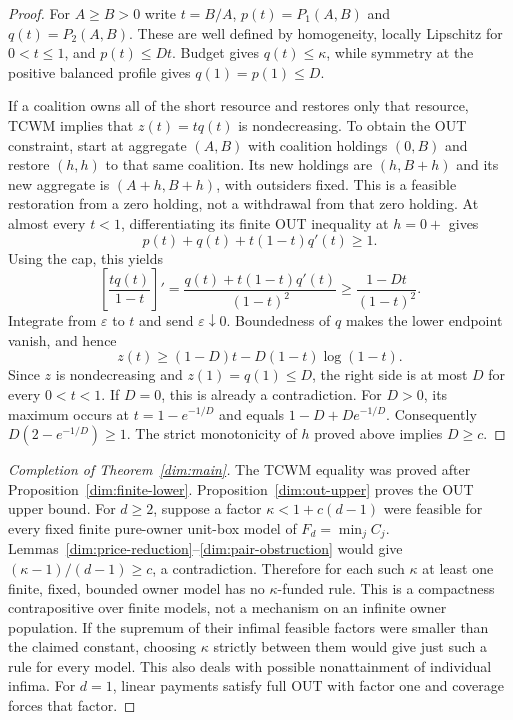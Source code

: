 \documentclass[11pt]{article}
\theoremstyle{definition}\newtheorem{definition}[theorem]{Definition}
\theoremstyle{remark}\newtheorem{remark}[theorem]{Remark}
\begin{document}
\begin{proof}
For $A\ge B>0$ write $t=B/A$, $p(t)=P_1(A,B)$ and $q(t)=P_2(A,B)$.
These are well defined by homogeneity, locally Lipschitz for $0<t\le1$,
and $p(t)\le Dt$. Budget gives $q(t)\le\kappa$, while symmetry at the
positive balanced profile gives $q(1)=p(1)\le D$.

If a coalition owns all of the short resource and restores only that
resource, TCWM implies that $z(t)=tq(t)$ is nondecreasing. To obtain the
OUT constraint, start at aggregate $(A,B)$ with coalition holdings
$(0,B)$ and restore $(h,h)$ to that same coalition. Its new holdings are
$(h,B+h)$ and its new aggregate is $(A+h,B+h)$, with outsiders fixed.
This is a feasible restoration from a zero holding, not a withdrawal
from that zero holding. At almost every $t<1$, differentiating its finite
OUT inequality at $h=0+$ gives
\[
 p(t)+q(t)+t(1-t)q'(t)\ge1.
\]
Using the cap, this yields
\[
 \left[\frac{tq(t)}{1-t}\right]'
 =\frac{q(t)+t(1-t)q'(t)}{(1-t)^2}
 \ge\frac{1-Dt}{(1-t)^2}.
\]
Integrate from $\varepsilon$ to $t$ and send $\varepsilon\downarrow0$.
Boundedness of $q$ makes the lower endpoint vanish, and hence
\[
 z(t)\ge (1-D)t-D(1-t)\log(1-t).
\]
Since $z$ is nondecreasing and $z(1)=q(1)\le D$, the right side is at
most $D$ for every $0<t<1$. If $D=0$, this is already a contradiction.
For $D>0$, its maximum occurs at $t=1-e^{-1/D}$ and equals
$1-D+De^{-1/D}$. Consequently
$D(2-e^{-1/D})\ge1$. The strict monotonicity of $h$ proved above implies
$D\ge c$.
\end{proof}

\begin{proof}[Completion of Theorem~\ref{dim:main}]
The TCWM equality was proved after Proposition~\ref{dim:finite-lower}.
Proposition~\ref{dim:out-upper} proves the OUT upper bound.
For $d\ge2$, suppose a factor $\kappa<1+c(d-1)$ were feasible for
every fixed finite pure-owner unit-box model of $F_d=\min_jC_j$.
Lemmas~\ref{dim:price-reduction}--\ref{dim:pair-obstruction} would give
$(\kappa-1)/(d-1)\ge c$, a contradiction. Therefore for each such
$\kappa$ at least one finite, fixed, bounded owner model has no
$\kappa$-funded rule. This is a compactness contrapositive over finite
models, not a mechanism on an infinite owner population.
If the supremum of their infimal feasible factors were smaller than the
claimed constant, choosing $\kappa$ strictly between them would give just
such a rule for every model. This also deals with possible nonattainment
of individual infima. For $d=1$, linear payments satisfy full OUT with
factor one and coverage forces that factor.
\end{proof}
\end{document}
